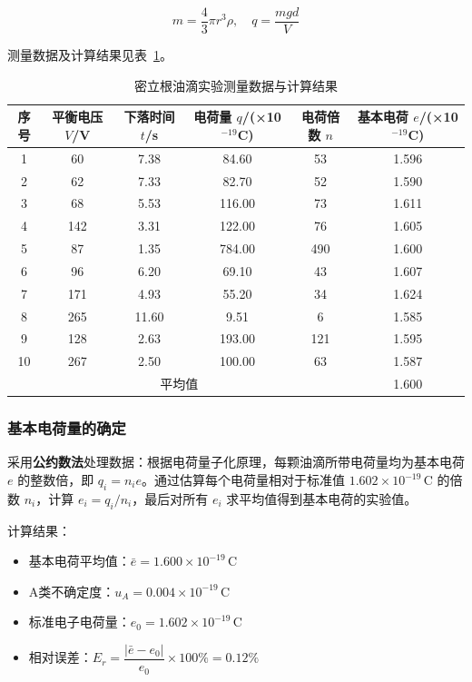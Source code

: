\documentclass{Phyport}
\begin{document}
\begin{equation}
    m = \frac{4}{3}\pi r^3 \rho, \quad q = \frac{mgd}{V}
\end{equation}

测量数据及计算结果见表~\ref{tab:millikan_data}。

\begin{table}[H]
    \centering
    \caption{密立根油滴实验测量数据与计算结果}
    \begin{tabular}{cccccc}
        \toprule
        序号 & 平衡电压 $V$/V & 下落时间 $t$/s & 电荷量 $q$/(×10$^{-19}$C) & 电荷倍数 $n$ & 基本电荷 $e$/(×10$^{-19}$C) \\
        \midrule
        1 & 60 & 7.38 & 84.60 & 53 & 1.596 \\
        2 & 62 & 7.33 & 82.70 & 52 & 1.590 \\
        3 & 68 & 5.53 & 116.00 & 73 & 1.611 \\
        4 & 142 & 3.31 & 122.00 & 76 & 1.605 \\
        5 & 87 & 1.35 & 784.00 & 490 & 1.600 \\
        6 & 96 & 6.20 & 69.10 & 43 & 1.607 \\
        7 & 171 & 4.93 & 55.20 & 34 & 1.624 \\
        8 & 265 & 11.60 & 9.51 & 6 & 1.585 \\
        9 & 128 & 2.63 & 193.00 & 121 & 1.595 \\
        10 & 267 & 2.50 & 100.00 & 63 & 1.587 \\
        \midrule
        \multicolumn{5}{c}{平均值} & 1.600 \\
        \bottomrule
    \end{tabular}
    \label{tab:millikan_data}
\end{table}

\subsubsection{基本电荷量的确定}

采用\textbf{公约数法}处理数据：根据电荷量子化原理，每颗油滴所带电荷量均为基本电荷 $e$ 的整数倍，即 $q_i = n_i e$。通过估算每个电荷量相对于标准值 $1.602 \times 10^{-19}\,\mathrm{C}$ 的倍数 $n_i$，计算 $e_i = q_i / n_i$，最后对所有 $e_i$ 求平均值得到基本电荷的实验值。

计算结果：
\begin{itemize}
    \item 基本电荷平均值：$\bar{e} = 1.600 \times 10^{-19}\,\mathrm{C}$
    \item A类不确定度：$u_A = 0.004 \times 10^{-19}\,\mathrm{C}$
    \item 标准电子电荷量：$e_0 = 1.602 \times 10^{-19}\,\mathrm{C}$
    \item 相对误差：$E_r = \dfrac{|\bar{e} - e_0|}{e_0} \times 100\% = 0.12\%$
\end{itemize}
\end{document}
